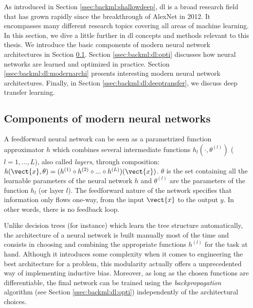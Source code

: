 As introduced in Section \ref{ssec:backml:shallowdeep}, \acrlong{dl} is a broad research field that has grown rapidly since the breakthrough of AlexNet in 2012. It encompasses many different research topics covering all areas of machine learning. In this section, we dive a little further in \acrlong{dl} concepts and methods relevant to this thesis. We introduce the basic components of modern neural network architectures in Section \ref{ssec:backml:dp:components}. Section \ref{ssec:backml:dl:opti} discusses how neural networks are learned and optimized in practice. Section \ref{ssec:backml:dl:modernarchi} presents interesting modern neural network architectures. Finally, in Section \ref{ssec:backml:dl:deeptransfer}, we discuss deep transfer learning.   

\subsection{Components of modern neural networks}
\label{ssec:backml:dp:components}

A feedforward neural network can be seen as a parametrized function approximator $h$ which combines several intermediate functions $h_l(\cdot, \theta^{(l)})$ ($l=1, ..., L$), also called \textit{layers}, through composition: $h(\vect{x}, \theta) = (h^{(1)} \circ h^{(2)} \circ ... \circ h^{(L)})(\vect{x})$. $\theta$ is the set containing all the learnable parameters of the neural network $h$ and $\theta^{(l)}$ are the parameters of the function $h_l$ (or layer $l$). The feedforward nature of the network specifies that information only flows one-way, from the input $\vect{x}$ to the output $y$. In other words, there is no feedback loop.

Unlike decision trees (for instance) which learn the tree structure automatically, the architecture of a neural network is built manually most of the time and consists in choosing and combining the appropriate functions $h^{(l)}$ for the task at hand. Although it introduces some complexity when it comes to engineering the best architecture for a problem, this modularity actually offers a unprecedented way of implementing inductive bias. Moreover, as long as the chosen functions are differentiable, the final network can be trained using the \textit{backpropagation} algorithm (see Section \ref{ssec:backml:dl:opti}) independently of the architectural choices.

